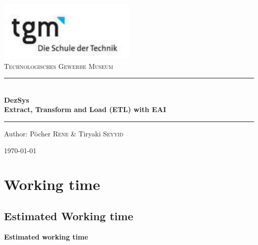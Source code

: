 \documentclass[12pt]{article}
\begin{document}
\begin{titlepage}
\begin{center}
\includegraphics[width=0.5\textwidth]{images/logo}\\[1cm]    

\textsc{\LARGE Technologisches Gewerbe Museum}\\[1.5cm]

\rule{12cm}{1mm}
{ \huge \bfseries  \\\large DezSys\\ \huge Extract, Transform and Load (ETL) with EAI \\[0.4cm] }

\rule{12cm}{1mm}

\noindent 
\vspace{5cm}

\begin{center}
\large
Author: 
Pöcher \textsc{Rene} \&
Tiryaki \textsc{Seyyid}
\end{center}

\vfill

{\large \today}

\end{center}
\end{titlepage}

\tableofcontents


\ohead{\headmark}

\newpage



\section{Working time}
\subsection{Estimated Working time}
\begin{center}
\textbf{Estimated working time}
\end{center}
\end{document}
